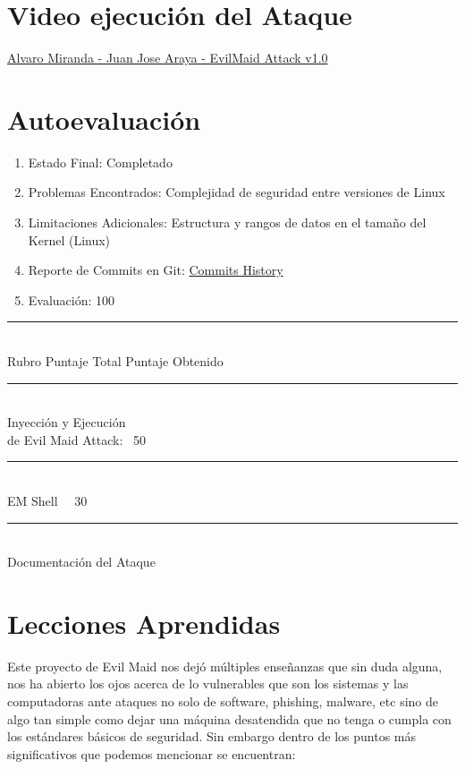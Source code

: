 \documentclass{article}
\begin{document}
\section*{Video ejecución del Ataque}

\href{https://drive.google.com/file/d/16Z2BiQohqdr1lCqQlngj6nGgPOOHObtK/view?usp=sharing}{Alvaro Miranda - Juan Jose Araya - EvilMaid Attack v1.0}

\section*{Autoevaluación}

\begin{enumerate}
    \item Estado Final: Completado
    \item Problemas Encontrados: Complejidad de seguridad entre versiones de Linux
    \item Limitaciones Adicionales: Estructura y rangos de datos en el tamaño del Kernel (Linux)
    \item Reporte de Commits en Git: \href{https://github.com/varitomirandacr/SeguridadSO_EvilMaid/commits/main}{Commits History}
    \item Evaluación: 100%
\end{enumerate}

    \noindent\rule{10cm}{0.4pt} \\
    Rubro   \qquad \qquad \qquad \qquad Puntaje Total    \qquad  Puntaje Obtenido \\
    \noindent\rule{10cm}{0.4pt} \\
    Inyección y Ejecución \\ 
    de Evil Maid Attack: \qquad \qquad \ 50 \qquad \qquad {} \\ 
    \noindent\rule{10cm}{0.1pt} \\
    EM Shell \qquad \qquad \qquad \qquad \quad \ \ 30 \qquad \qquad {}\\
    \noindent\rule{10cm}{0.1pt} \\
    Documentación del Ataque  \qquad \qquad {}

\section*{Lecciones Aprendidas}

Este proyecto de Evil Maid nos dejó múltiples enseñanzas que sin duda alguna, nos ha abierto los ojos acerca de lo vulnerables que son los sistemas y las computadoras ante ataques no solo de software, phishing, malware, etc sino de algo tan simple como dejar una máquina desatendida que no tenga o cumpla con los estándares básicos de seguridad. Sin embargo dentro de los puntos más significativos que podemos mencionar se encuentran:
\end{document}
